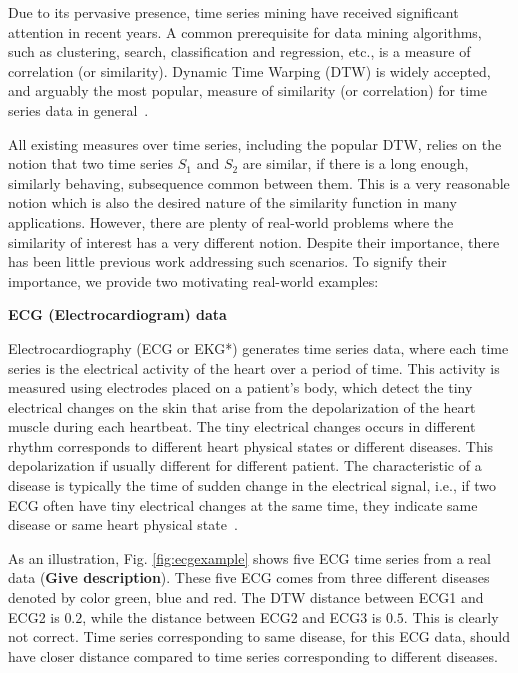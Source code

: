 Due to its pervasive presence, time series mining have received significant attention in recent years. A common prerequisite for data mining algorithms, such as clustering, search, classification and regression, etc., is a measure of correlation (or similarity). Dynamic Time Warping (DTW) is widely accepted, and arguably the most popular, measure of similarity (or correlation) for time series data in general~\cite{rakthanmanon2012searching, muller2007dynamic, chen2013dtw}.

All existing measures over time series, including the popular DTW, relies on the notion that two time series $S_1$ and $S_2$ are similar, if there is a long enough, similarly behaving, subsequence common between them. This is a very reasonable notion which is also the desired nature of the similarity function in many applications.  However, there are plenty of real-world problems where the similarity of interest has a very different notion. Despite their importance, there has been little previous work addressing such scenarios. To signify their importance, we provide two motivating real-world examples:


\textbf{ECG (Electrocardiogram) data}

Electrocardiography \cite{holter1961new} (ECG or EKG*) generates time series data, where each time series is the electrical activity of the heart over a period of time. This activity is measured using electrodes placed on a patient's body, which detect the tiny electrical changes on the skin that arise from the depolarization of the heart muscle during each heartbeat. The tiny electrical changes occurs in different rhythm corresponds to different heart physical states or different diseases. This depolarization  if usually different for different patient. The characteristic of a disease is typically the time of sudden change in the electrical signal, i.e., if two ECG often have tiny electrical changes at the same time, they indicate same disease or same heart physical state~\cite{marriott1988practical}.


As an illustration, Fig. \ref{fig:ecgexample} shows five ECG time series from a real data ({\bf Give description}). These five ECG comes from three different diseases denoted by color green, blue and red.  The DTW distance between ECG1 and ECG2 is $0.2$, while the distance between ECG2 and ECG3 is $0.5$. This is clearly not correct. Time series corresponding to same disease, for this ECG data, should have closer distance compared to time series corresponding to different diseases. 

